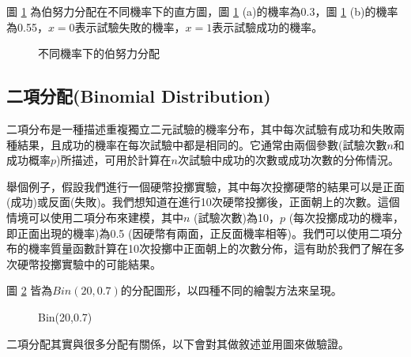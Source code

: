 圖 \ref{fig:bernoulli(p)} 為伯努力分配在不同機率下的直方圖，圖 \ref{fig:bernoulli(p)} (a)的機率為0.3，圖 \ref{fig:bernoulli(p)} (b)的機率為0.55，$x=0$表示試驗失敗的機率，$x=1$表示試驗成功的機率。
\begin{figure}[H]
    \centering
    \caption{不同機率下的伯努力分配}
    \label{fig:bernoulli(p)}
\end{figure}
\subsection{二項分配(Binomial Distribution)}
二項分布是一種描述重複獨立二元試驗的機率分布，其中每次試驗有成功和失敗兩種結果，且成功的機率在每次試驗中都是相同的。它通常由兩個參數(試驗次數$n$和成功概率$p$)所描述，可用於計算在$n$次試驗中成功的次數或成功次數的分佈情況。

舉個例子，假設我們進行一個硬幣投擲實驗，其中每次投擲硬幣的結果可以是正面(成功)或反面(失敗)。我們想知道在進行10次硬幣投擲後，正面朝上的次數。這個情境可以使用二項分布來建模，其中$n$ (試驗次數)為10，$p$ (每次投擲成功的機率，即正面出現的機率)為0.5 (因硬幣有兩面，正反面機率相等)。我們可以使用二項分布的機率質量函數計算在10次投擲中正面朝上的次數分佈，這有助於我們了解在多次硬幣投擲實驗中的可能結果。

圖 \ref{fig:binomial(20,0.7)} 皆為$Bin(20,0.7)$的分配圖形，以四種不同的繪製方法來呈現。
\begin{figure}[h]
    \caption{Bin(20,0.7)}
    \label{fig:binomial(20,0.7)}
\end{figure}

二項分配其實與很多分配有關係，以下會對其做敘述並用圖來做驗證。

